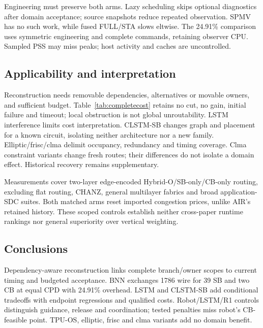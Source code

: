 \documentclass[conference,10pt]{IEEEtran}
\begin{document}
Engineering must preserve both arms. Lazy scheduling skips optional diagnostics after domain acceptance; source snapshots reduce repeated observation. SPMV has no such work, while fused FULL/STA slows eltwise. The 24.91\% comparison uses symmetric engineering and complete commands, retaining observer CPU. Sampled PSS may miss peaks; host activity and caches are uncontrolled.

\subsection{Applicability and interpretation}
Reconstruction needs removable dependencies, alternatives or movable owners, and sufficient budget. Table~\ref{tab:completecost} retains no cut, no gain, initial failure and timeout; local obstruction is not global unroutability. LSTM interference limits cost interpretation. CLSTM-SB changes graph and placement for a known circuit, isolating neither architecture nor a new family. Elliptic/frisc/clma delimit occupancy, redundancy and timing coverage. Clma constraint variants change fresh routes; their differences do not isolate a domain effect. Historical recovery remains supplementary.

Measurements cover two-layer edge-encoded Hybrid-O/SB-only/CB-only routing, excluding flat routing, CHANZ, general multilayer fabrics and broad application-SDC suites. Both matched arms reset imported congestion prices, unlike AIR's retained history. These scoped controls establish neither cross-paper runtime rankings nor general superiority over vertical weighting.

\subsection{Conclusions}
Dependency-aware reconstruction links complete branch/owner scopes to current timing and budgeted acceptance. BNN exchanges 1786 wire for 39 SB and two CB at equal CPD with 24.91\% overhead. LSTM and CLSTM-SB add conditional tradeoffs with endpoint regressions and qualified costs. Robot/LSTM/R1 controls distinguish guidance, release and coordination; tested penalties miss robot's CB-feasible point. TPU-OS, elliptic, frisc and clma variants add no domain benefit.


\end{document}

